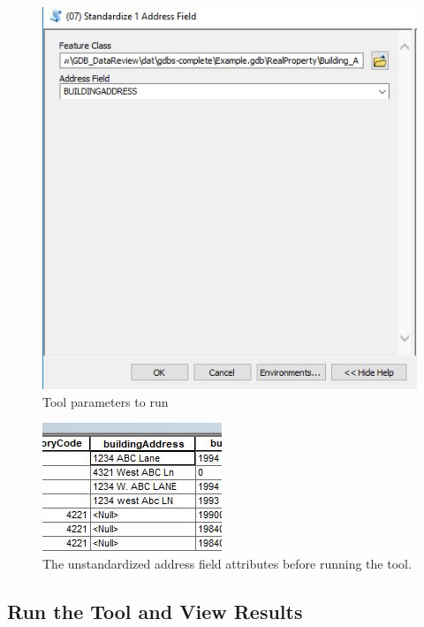 \documentclass[openany]{book}
\theoremstyle{definition}
\theoremstyle{definition}
\theoremstyle{definition}
\theoremstyle{remark}
\begin{document}
\begin{figure}[H]

{\centering \includegraphics{figures/std1-toolparams} 

}

\caption{Tool parameters to run}\label{fig:std1params}
\end{figure}\begin{figure}[H]

{\centering \includegraphics{figures/std1-before} 

}

\caption{The unstandardized address field attributes before running the tool.}\label{fig:std1before}
\end{figure}

\subsection{Run the Tool and View
Results}\label{run-the-tool-and-view-results-6}
\end{document}
